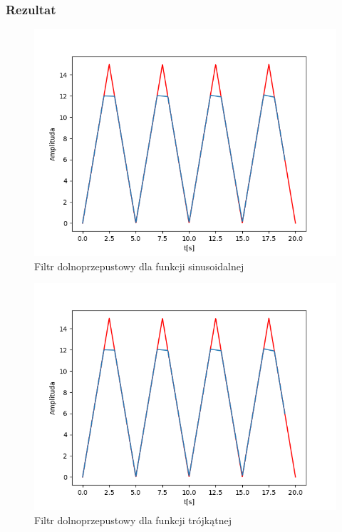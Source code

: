 \documentclass[12pt]{article}
\begin{document}
\subsubsection{Rezultat}
\begin{figure}[H]
\centering
\includegraphics[scale=0.6]{8trojkatInterp1rzedu20.png}
\caption{Filtr dolnoprzepustowy dla funkcji sinusoidalnej}
\end{figure}

\begin{figure}[H]
\centering
\includegraphics[scale=0.6]{8trojkatInterp1rzedu20.png}
\caption{Filtr dolnoprzepustowy dla funkcji trójkątnej}
\end{figure}
\end{document}
